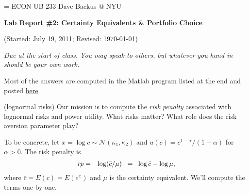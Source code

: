 \documentclass[11pt]{exam}
\begin{document}
\parskip=\bigskipamount
\parindent=0.0in
\thispagestyle{empty}
{\large ECON-UB 233 \hfill Dave Backus @ NYU}

\bigskip\bigskip
\centerline{\Large \bf Lab Report \#2: Certainty Equivalents \& Portfolio Choice}
\centerline{(Started: July 19, 2011; Revised: \today)}

\bigskip
{\it Due at the start of class.
You may speak to others, but whatever you hand in should be your own work.}

\begin{questions}

\begin{solution}
Most of the answers are computed in the Matlab
program listed at the end and posted
\href{http://pages.stern.nyu.edu/~dbackus/233/hw2_s12.m}{here}.
\end{solution}

\question (lognormal risks)
Our mission is to compute the {\it risk penalty\/}
associated with lognormal risks and power utility.
What risks matter?  What role does the risk aversion parameter play?

To be concrete, let $x = \log c \sim \mathcal{N}(\kappa_1, \kappa_2)$
and $u(c) = c^{1-\alpha}/(1-\alpha)$ for $\alpha> 0$.
The risk penalty is
\begin{eqnarray*}
    \mbox{\it rp\/} &=& \log (\bar{c}/\mu)
                \;\;=\;\; \log \bar{c} - \log \mu ,
\end{eqnarray*}
where $\bar{c} = E (c) = E( e^{x})$ and $\mu$ is the certainty equivalent.
We'll compute the terms one by one.

\end{questions}
\end{document}
